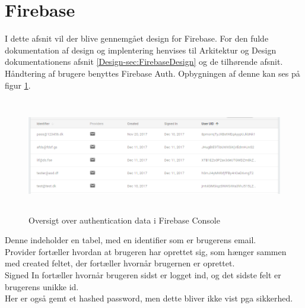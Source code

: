 \section{Firebase}
I dette afsnit vil der blive gennemgået design for Firebase. For den fulde dokumentation af design og implentering henvises til Arkitektur og Design dokumentationens afsnit \ref{Design-sec:FirebaseDesign} og de tilhørende afsnit. \\

Håndtering af brugere benyttes Firebase Auth\cite{FirebaseAuth}. Opbygningen af denne kan ses på figur \ref{fig:FirebaseAuthPNG}.

\begin{figure}[H] %
	\centering
	\includegraphics[height=5cm, width=15cm]{Design/Firebase/FirebaseAuth}
	\caption{Oversigt over authentication data i Firebase Console}
	\label{fig:FirebaseAuthPNG}
\end{figure}
Denne indeholder en tabel, med en identifier som er brugerens email. \\
Provider fortæller hvordan at brugeren har oprettet sig, som hænger sammen med created feltet, der fortæller hvornår brugernen er oprettet. \\
Signed In fortæller hvornår brugeren sidst er logget ind, og det sidste felt er brugerens unikke id. \\
Her er også gemt et hashed password, men dette bliver ikke vist pga sikkerhed. \\

\clearpage

